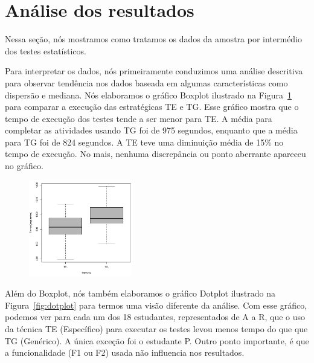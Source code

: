 \section{An\'alise dos resultados}
\label{sec:resultados}


Nessa seção, nós mostramos como tratamos os dados da amostra por intermédio dos testes estatísticos. 

Para interpretar os dados, nós primeiramente conduzimos uma análise descritiva
para observar tendência nos dados baseada em algumas características como
dispersão e mediana. Nós elaboramos o gráfico Boxplot ilustrado na
Figura~\ref{fig:boxplot} para comparar a execução das estratégicas TE e TG. Esse
gráfico mostra que o tempo de execução dos testes tende a ser menor para TE. A
média para completar as atividades usando TG foi de 975 segundos, enquanto que a
média para TG foi de 824 segundos. A TE teve uma diminuição média de 15\% no
tempo de execução. No mais, nenhuma discrepância ou ponto aberrante apareceu no
gráfico.

\begin{figure}[t]
    \centering
    \includegraphics[width=0.4\textwidth]{images/boxplot.png}
    \caption{}
    \label{fig:boxplot}
\end{figure}

Além do Boxplot, nós também elaboramos o gráfico Dotplot ilustrado na
Figura~\ref{fig:dotplot} para termos uma visão diferente da análise. Com esse
gráfico, podemos ver para cada um dos 18 estudantes, representados de A a R, que
o uso da técnica TE (Específico) para executar os testes levou menos tempo do
que que TG (Genérico). A única exceção foi o estudante P. Outro ponto
importante, é que a funcionalidade (F1 ou F2) usada não influencia nos
resultados.

